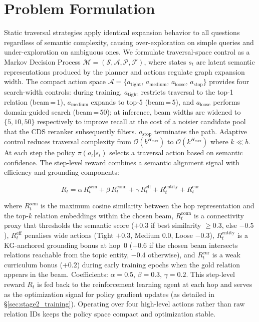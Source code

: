 \documentclass[10pt,conference]{IEEEtran}
\begin{document}

\section{Problem Formulation}
\label{sec:probform}

Static traversal strategies apply identical expansion behavior to all questions regardless of semantic complexity, causing over-exploration on simple queries and under-exploration on ambiguous ones. We formulate traversal-space control as a Markov Decision Process $\mathcal{M}=(\mathcal{S},\mathcal{A},\mathcal{P},\mathcal{F})$, where states $s_t$ are latent semantic representations produced by the planner and actions regulate graph expansion width. The compact action space $\mathcal{A} = \{ a_{\text{tight}},\, a_{\text{medium}},\, a_{\text{loose}},\, a_{\text{stop}} \}$ provides four search-width controls: during training, $a_{\text{tight}}$ restricts traversal to the top-1 relation (beam\,=\,1), $a_{\text{medium}}$ expands to top-5 (beam\,=\,5), and $a_{\text{loose}}$ performs domain-guided search (beam\,=\,50); at inference, beam widths are widened to $\{5, 10, 50\}$ respectively to improve recall at the cost of a noisier candidate pool that the CDS reranker subsequently filters. $a_{\text{stop}}$ terminates the path. Adaptive control reduces traversal complexity from $\mathcal{O}(b^{H_{\max}})$ to $\mathcal{O}(k^{H_{\max}})$ where $k \ll b$. At each step the policy $\pi(a_t|s_t)$ selects a traversal action based on semantic confidence. The step-level reward combines a semantic alignment signal with efficiency and grounding components:

\begin{equation}
\label{eq:reward}
R_t = \alpha\, R^{\text{sem}}_t + \beta\, R^{\text{conn}}_t + \gamma\, R^{\text{eff}}_t + R^{\text{entity}}_t + R^{\text{cur}}_t
\end{equation}

where $R^{\text{sem}}_t$ is the maximum cosine similarity between the hop representation and the top-$k$ relation embeddings within the chosen beam, $R^{\text{conn}}_t$ is a connectivity proxy that thresholds the semantic score ($+0.3$ if best similarity $\ge 0.3$, else $-0.5$), $R^{\text{eff}}_t$ penalises wide actions (Tight $+0.3$, Medium $0.0$, Loose $-0.3$), $R^{\text{entity}}_t$ is a KG-anchored grounding bonus at hop~0 ($+0.6$ if the chosen beam intersects relations reachable from the topic entity, $-0.4$ otherwise), and $R^{\text{cur}}_t$ is a weak curriculum bonus ($+0.2$) during early training epochs when the gold relation appears in the beam. Coefficients: $\alpha{=}0.5$, $\beta{=}0.3$, $\gamma{=}0.2$. This step-level reward $R_t$ is fed back to the reinforcement learning agent at each hop and serves as the optimization signal for policy gradient updates (as detailed in §\ref{sec:stage2_training}). Operating over four high-level actions rather than raw relation IDs keeps the policy space compact and optimization stable.
\end{document}
